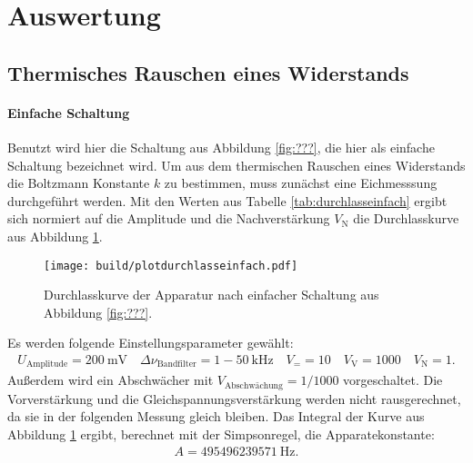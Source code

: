 \section{Auswertung}
\label{sec:Auswertung}

\subsection{Thermisches Rauschen eines Widerstands}

\paragraph{Einfache Schaltung}

Benutzt wird hier die Schaltung aus Abbildung \ref{fig:???}, die hier als einfache Schaltung bezeichnet wird. Um aus dem thermischen Rauschen eines Widerstands die Boltzmann Konstante $k$ zu bestimmen, muss zunächst eine Eichmesssung durchgeführt werden. Mit den Werten aus Tabelle \ref{tab:durchlasseinfach} ergibt sich normiert auf die Amplitude und die Nachverstärkung $V_\text{N}$ die Durchlasskurve aus Abbildung \ref{fig:plotdurchlasseinfach}.
\begin{figure}
  \centering
  \texttt{[image: build/plotdurchlasseinfach.pdf]}
  \caption{Durchlasskurve der Apparatur nach einfacher Schaltung aus Abbildung \ref{fig:???}.}
  \label{fig:plotdurchlasseinfach}
\end{figure}
Es werden folgende Einstellungsparameter gewählt:
\begin{align*}
  U_\text{Amplitude} = \SI{200}{\milli\volt} \quad \Delta \nu_\text{Bandfilter} = \num{1}-\SI{50}{\kilo\hertz}\quad V_= = 10 \quad V_\text{V} = 1000 \quad V_\text{N} = 1.
\end{align*}
Außerdem wird ein Abschwächer mit $V_\text{Abschwächung} = 1/1000$ vorgeschaltet. Die Vorverstärkung und die Gleichspannungsverstärkung werden nicht rausgerechnet, da sie in der folgenden Messung gleich bleiben. Das Integral der Kurve aus Abbildung \ref{fig:plotdurchlasseinfach} ergibt, berechnet mit der Simpsonregel, die Apparatekonstante:
\begin{align}
  A = \SI{495496239571}{\hertz}.
\end{align}

